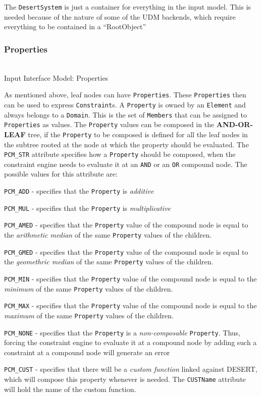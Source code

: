 \documentclass{article}
\begin{document}
{\par
  The {\tt DesertSystem} is just a container for everything in the input model. This is needed because of the nature of some of the UDM backends, which require everything to be contained in a ``RootObject''
}
\subsubsection{Properties}
\label{prop}
\vspace{1cm}
\begin{center}
 \\
 Input Interface Model: Properties
\end{center}
\vspace{1cm}
{\par As mentioned above, leaf nodes can have {\tt Properties}. These {\tt Properties} then can be used to express {\tt Constraint}s. A {\tt Property} is owned by an {\tt Element} and always belongs to a {\tt Domain}. This is the set of {\tt Members} that can be assigned to {\tt Properties} as values. The {\tt Property} values can be composed in the {\bf AND-OR-LEAF} tree, if the {\tt Property} to be composed is defined for all the leaf nodes in the subtree rooted at the node at which the property should be evaluated.
The {\tt PCM\_STR} attribute specifies how a {\tt Property} should be composed, when the constraint engine needs to evaluate it at an {\tt AND} or an {\tt OR} compound node. The possible values for this attribute are:
}
{\par
\begin{list}{}{}
\item {{\tt PCM\_ADD} - specifies that the {\tt Property} is {\it additive} }
\item {{\tt PCM\_MUL} - specifies that the {\tt Property} is {\it multiplicative} }
\item {{\tt PCM\_AMED} - specifies that the {\tt Property} value of the compound node is equal to the  {\it arithmetic median} of the same {\tt Property} values of the children. }
\item {{\tt PCM\_GMED} - specifies that the {\tt Property} value of the compound node is equal to the {\it geomethric  median} of the same {\tt Property} values of the children. }
\item {{\tt PCM\_MIN} - specifies that the {\tt Property} value of the compound node is equal to the {\it minimum} of the same {\tt Property} values of the children. }
\item {{\tt PCM\_MAX} - specifies that the {\tt Property} value of the compound node is equal to the {\it maximum} of the same {\tt Property} values of the children. }
\item {{\tt PCM\_NONE} - specifies that the {\tt Property} is a {\it non-composable} {\tt Property}. Thus, forcing the constraint engine to evaluate it at a compound node by adding such a constraint at a compound node will generate an error}
\item {{\tt PCM\_CUST} - specifies that there will be a {\it custom function} linked against DESERT, which will compose this property whenever is needed.  The {\tt CUSTName} attribute will hold the name of the custom function.}
\end{list}
}
\end{document}
